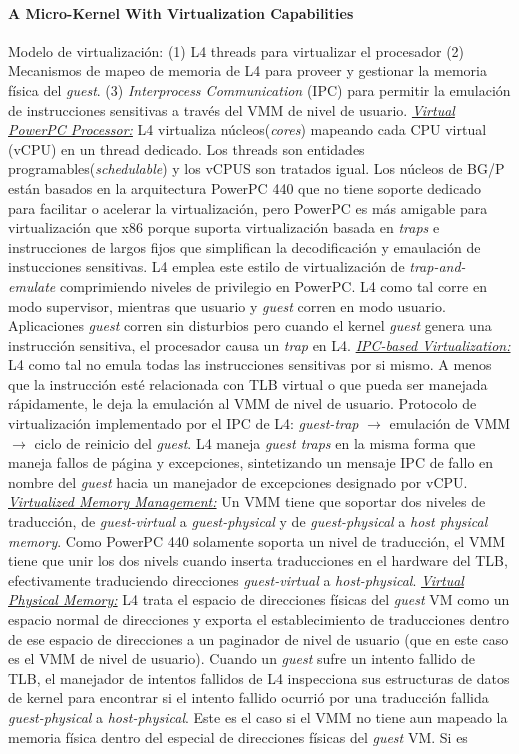 \paragraph{\textnormal{\textbf{A Micro-Kernel With Virtualization Capabilities}}}
Modelo de virtualización: (1) L4 threads para virtualizar el procesador (2) Mecanismos de mapeo de memoria de L4 para proveer y gestionar la memoria física del \emph{guest}. (3) \emph{Interprocess Communication} (IPC) para permitir la emulación de instrucciones sensitivas a través del VMM de nivel de usuario. \underline{\emph{Virtual PowerPC Processor:}} L4 virtualiza núcleos(\emph{cores}) mapeando cada CPU virtual (vCPU) en un thread dedicado. Los threads son entidades programables(\emph{schedulable}) y los vCPUS son tratados igual. Los núcleos de BG/P están basados en la arquitectura PowerPC 440 que no tiene soporte dedicado para facilitar o acelerar la virtualización, pero PowerPC es más amigable para virtualización que x86 porque suporta virtualización basada en \emph{traps} e instrucciones de largos fijos que simplifican la decodificación y emaulación de instucciones sensitivas. L4 emplea este estilo de virtualización de \emph{trap-and-emulate} comprimiendo niveles de privilegio en PowerPC. L4 como tal corre en modo supervisor, mientras que usuario y \emph{guest} corren en modo usuario. Aplicaciones \emph{guest} corren sin disturbios pero cuando el kernel \emph{guest} genera una instrucción sensitiva, el procesador causa un \emph{trap} en L4. \underline{\emph{IPC-based Virtualization:}} L4 como tal no emula todas las instrucciones sensitivas por si mismo. A menos que la instrucción esté relacionada con TLB virtual o que pueda ser manejada rápidamente, le deja la emulación al VMM de nivel de usuario. Protocolo de virtualización implementado por el IPC de L4: \emph{guest-trap} $\rightarrow$ emulación de VMM $\rightarrow$ ciclo de reinicio del \emph{guest}. L4 maneja \emph{guest traps} en la misma forma que maneja fallos de página y excepciones, sintetizando un mensaje IPC de fallo en nombre del \emph{guest} hacia un manejador de excepciones designado por vCPU. \underline{\emph{Virtualized Memory Management:}} Un VMM tiene que soportar dos niveles de traducción, de \emph{guest-virtual} a \emph{guest-physical} y de \emph{guest-physical} a \emph{host physical memory}. Como PowerPC 440 solamente soporta un nivel de traducción, el VMM tiene que unir los dos nivels cuando inserta traducciones en el hardware del TLB, efectivamente traduciendo direcciones \emph{guest-virtual} a \emph{host-physical}. \underline{\emph{Virtual Physical Memory:}} L4 trata el espacio de direcciones físicas del \emph{guest} VM como un espacio normal de direcciones y exporta el establecimiento de traducciones dentro de ese espacio de direcciones a un paginador de nivel de usuario (que en este caso es el VMM de nivel de usuario). Cuando un \emph{guest} sufre un intento fallido de TLB, el manejador de intentos fallidos de L4 inspecciona sus estructuras de datos de kernel para encontrar si el intento fallido ocurrió por una traducción fallida \emph{guest-physical} a \emph{host-physical}. Este es el caso si el VMM no tiene aun mapeado la memoria física dentro del especial de direcciones físicas del \emph{guest} VM. Si es 